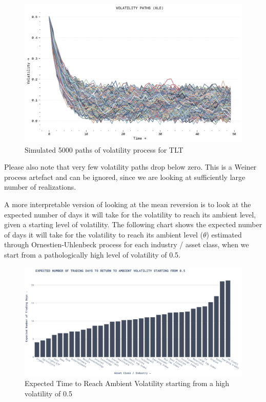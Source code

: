 \begin{figure}[H]
    \centering
    \includegraphics[width=\textwidth]{images/volatility_paths.png}
    \caption{Simulated 5000 paths of volatility process for TLT}
    \label{fig:figure_label}
\end{figure}

Please also note that very few volatility paths drop below zero. This is a Weiner process artefact and can be ignored, since we are looking at sufficiently large number of realizations.

A more interpretable version of looking at the mean reversion is to look at the expected number of days it will take for the volatility to reach its ambient level, given a starting level of volatility. The following chart shows the expected number of days it will take for the volatility to reach its ambient level ($\theta$) estimated through Ornestien-Uhlenbeck process for each industry / asset class, when we start from a pathologically high level of volatility of 0.5.

\begin{figure}[H]
    \centering
    \includegraphics[width=\textwidth]{images/time_to_theta.png}
    \caption{Expected Time to Reach Ambient Volatility starting from a high volatility of 0.5}
    \label{fig:figure_label}
\end{figure}



